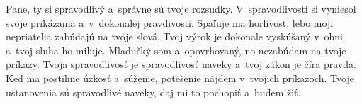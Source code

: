 Pane, ty si spravodlivý
a~správne sú tvoje rozsudky.
\versseparator
V~spravodlivosti si vyniesol svoje prikázania
a~v~dokonalej pravdivosti.
\versseparator
Spaľuje ma horlivosť,
lebo moji nepriatelia zabúdajú na tvoje slová.
\versseparator
Tvoj výrok je dokonale vyskúšaný v~ohni
a~tvoj sluha ho miluje.
\versseparator
Mladučký som a~opovrhovaný,
no nezabúdam na tvoje príkazy.
\versseparator
Tvoja spravodlivosť je spravodlivosť naveky
a~tvoj zákon je číra pravda.
\versseparator
Keď ma postihne úzkosť a~súženie,
potešenie nájdem v~tvojich príkazoch.
\versseparator
Tvoje ustanovenia sú spravodlivé naveky,
daj mi to pochopiť a~budem žiť.